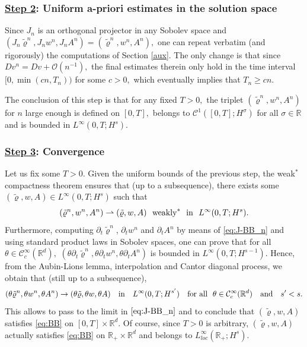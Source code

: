 \documentclass[11pt,twoside]{amsart}
\newcommand\R{\mathbb{R}}
\def\cC{{\mathcal C}}
\newcommand{\andf}{\quad\hbox{and}\quad}
\begin{document}
\subsubsection*{\underline{Step 2}: Uniform a-priori estimates in the solution space}
Since  $J_n$ is an orthogonal projector in any Sobolev space and  $(J_n\tilde\varrho^n,J_n w^n,J_nA^n)=(\tilde\varrho^n,w^n,A^n),$
 one can repeat verbatim (and rigorously) the computations of Section \ref{aux}. The only change is that 
 since $Dv^n=Dv +{\mathcal O}(n^{-1}),$  the final estimates therein
 only hold in the time interval $[0,\min(cn,T_n))$ for some $c>0,$
 which eventually implies that  $T_n\geq cn.$
 
   

The conclusion of this step is that for any fixed $T>0,$ the triplet 
 $(\tilde\varrho^n,w^n, A^n)$  for $n$ large enough is defined on $[0,T],$  
 belongs to $\cC^1([0,T];H^\sigma)$ for all $\sigma\in\R$ and is
bounded in $L^\infty(0,T; H^s).$



\subsubsection*{\underline{Step 3}: Convergence}    Let us fix some $T>0.$ 
Given the uniform bounds of the previous step, the weak$^*$ compactness theorem 
ensures that (up to a subsequence),  there exists some $(\tilde\varrho,w,A) \in L^\infty(0,T ; H^s)$ such that 
$$(\tilde\varrho^n,w^n,A^n)\rightharpoonup (\tilde\varrho,w,A) \ \hbox{ weakly}^* \ \hbox{ in }\  L^\infty(0,T;H^s).$$
Furthermore, computing $\partial_t\tilde\varrho^n$, $\partial_t w^n$ and $\partial_t A^n$ by means of \eqref{eq:J-BB_n} and using 
standard product laws in Sobolev spaces, one can prove that  for all $\theta\in \cC^\infty_c(\R^d),$ 
$(\theta\partial_t\tilde\varrho^n,\theta\partial_t w^n,\theta\partial_t A^n)$ is bounded in $L^\infty(0,T; H^{s-1}).$ 
Hence, from  the Aubin-Lions lemma, interpolation and Cantor diagonal process, we obtain that (still up to a subsequence), 
$$(\theta\tilde\varrho^n,\theta w^n,\theta A^n)\to (\theta\tilde\varrho,\theta w,\theta A)\quad\hbox{in}\quad L^\infty(0,T;H^{s'})
\quad\hbox{for all }\ \theta\in \cC^\infty_c(\R^d)\andf s'<s.$$
This allows to pass to the limit in $\eqref{eq:J-BB_n}$ and to conclude that 
$(\tilde\varrho,w,A)$ satisfies \eqref{eq:BB} on $[0,T]\times\R^d.$ Of course, since $T>0$ is arbitrary, $(\tilde\varrho,w,A)$
actually satisfies  \eqref{eq:BB} on $\R_+\times\R^d$ and belongs to $L^\infty_{loc}(\R_+ ; H^s).$ 
\end{document}
